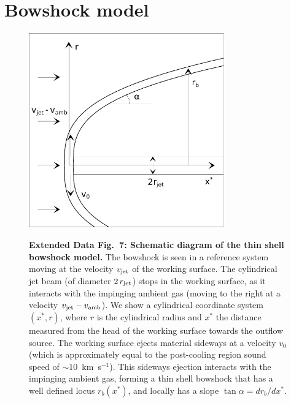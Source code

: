 \documentclass[12pt]{mythesis}
\begin{document}
\section{Bowshock model}\label{sec:model}

\begin{figure}[p!]
\begin{center}
\includegraphics[width=0.75\textwidth]{figures/bowshock_scheme.pdf}\\
\caption[Schematic diagram of the thin shell bowshock model]{{\bf Extended Data Fig.\ 7: Schematic diagram of the thin shell bowshock model.} The bowshock is seen in a reference system moving at the velocity $v_{\rm jet}$ of the working surface. The cylindrical jet beam (of diameter $2\,r_{\rm jet}$) stops in the working surface, as it interacts with the impinging ambient gas (moving to the right at a velocity $v_{\rm jet}-v_{\rm amb}$). We show a cylindrical coordinate system $(x^*,r)$, where $r$ is the cylindrical radius and $x^*$ the distance measured from the head of the working surface towards the outflow source. The working surface ejects material sideways at a velocity $v_0$ (which is approximately equal to the post-cooling region sound speed of $\sim 10$~km~s$^{-1}$). This sideways ejection interacts with the impinging ambient gas, forming a thin shell bowshock that has a well defined locus $r_b(x^*)$, and locally has a slope $\tan\alpha=dr_b/dx^*$.
\label{a1}
}
\end{center}
\end{figure}

\end{document}
